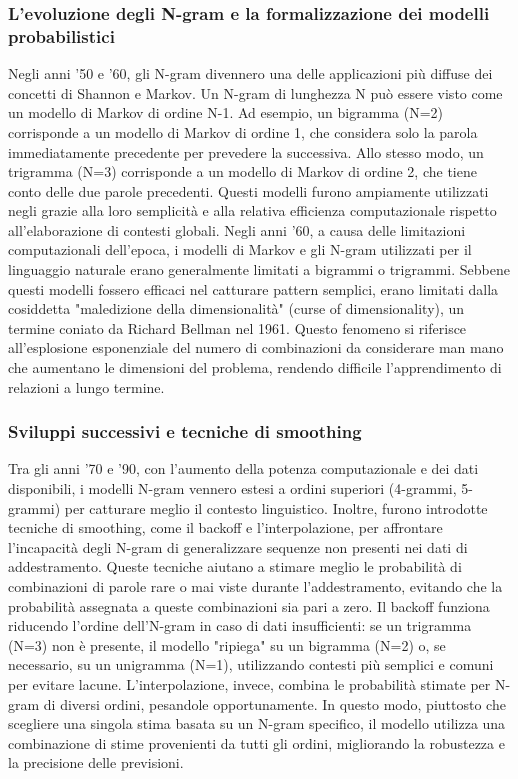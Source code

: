 \documentclass[target=mst,aauheader=,style=]{thud}
\begin{document}
\subsubsection{L'evoluzione degli N-gram e la formalizzazione dei modelli probabilistici}
Negli anni ’50 e ’60, gli N-gram divennero una delle applicazioni più diffuse dei concetti di Shannon e Markov. Un N-gram di lunghezza N può essere visto come un modello di Markov di ordine N-1. Ad esempio, un bigramma (N=2) corrisponde a un modello di Markov di ordine 1, che considera solo la parola immediatamente precedente per prevedere la successiva. Allo stesso modo, un trigramma (N=3) corrisponde a un modello di Markov di ordine 2, che tiene conto delle due parole precedenti. Questi modelli furono ampiamente utilizzati negli grazie alla loro semplicità e alla relativa efficienza computazionale rispetto all’elaborazione di contesti globali.
Negli anni '60, a causa delle limitazioni computazionali dell'epoca, i modelli di Markov e gli N-gram utilizzati per il linguaggio naturale erano generalmente limitati a bigrammi o trigrammi. Sebbene questi modelli fossero efficaci nel catturare pattern semplici, erano limitati dalla cosiddetta "maledizione della dimensionalità" (curse of dimensionality), un termine coniato da Richard Bellman nel 1961. Questo fenomeno si riferisce all'esplosione esponenziale del numero di combinazioni da considerare man mano che aumentano le dimensioni del problema, rendendo difficile l'apprendimento di relazioni a lungo termine.\cite{bellman_1957}

\subsubsection{Sviluppi successivi e tecniche di smoothing}
Tra gli anni ’70 e ’90, con l’aumento della potenza computazionale e dei dati disponibili, i modelli N-gram vennero estesi a ordini superiori (4-grammi, 5-grammi) per catturare meglio il contesto linguistico. Inoltre, furono introdotte tecniche di smoothing, come il backoff e l’interpolazione, per affrontare l’incapacità degli N-gram di generalizzare sequenze non presenti nei dati di addestramento.
Queste tecniche aiutano a stimare meglio le probabilità di combinazioni di parole rare o mai viste durante l’addestramento, evitando che la probabilità assegnata a queste combinazioni sia pari a zero. Il backoff funziona riducendo l’ordine dell’N-gram in caso di dati insufficienti: se un trigramma (N=3) non è presente, il modello "ripiega" su un bigramma (N=2) o, se necessario, su un unigramma (N=1), utilizzando contesti più semplici e comuni per evitare lacune.
L’interpolazione, invece, combina le probabilità stimate per N-gram di diversi ordini, pesandole opportunamente. In questo modo, piuttosto che scegliere una singola stima basata su un N-gram specifico, il modello utilizza una combinazione di stime provenienti da tutti gli ordini, migliorando la robustezza e la precisione delle previsioni.\cite{wu_2000}
\end{document}

